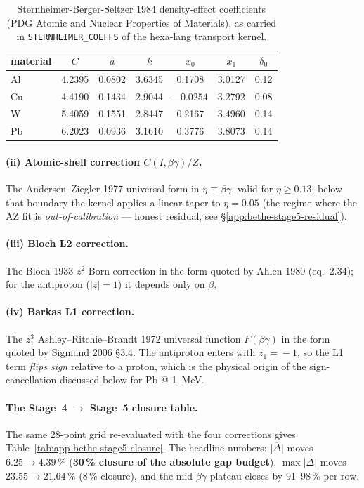 \begin{table}[h]
\centering
\small
\setlength{\tabcolsep}{6pt}
\begin{tabular}{@{}l c c c c c c@{}}
\toprule
material & $C$ & $a$ & $k$ & $x_0$ & $x_1$ & $\delta_0$ \\
\midrule
Al & 4.2395 & 0.0802 & 3.6345 & 0.1708 & 3.0127 & 0.12 \\
Cu & 4.4190 & 0.1434 & 2.9044 & $-0.0254$ & 3.2792 & 0.08 \\
W  & 5.4059 & 0.1551 & 2.8447 & 0.2167 & 3.4960 & 0.14 \\
Pb & 6.2023 & 0.0936 & 3.1610 & 0.3776 & 3.8073 & 0.14 \\
\bottomrule
\end{tabular}
\caption{Sternheimer-Berger-Seltzer 1984 density-effect coefficients
(PDG Atomic and Nuclear Properties of Materials), as carried in
\texttt{STERNHEIMER\_COEFFS} of the hexa-lang transport kernel.}
\label{tab:app-bethe-sternheimer-coeffs}
\end{table}

\paragraph{(ii) Atomic-shell correction $C(I,\beta\gamma)/Z$.} The
Andersen--Ziegler 1977 universal form in $\eta\!\equiv\!\beta\gamma$,
valid for $\eta\!\ge\!0.13$; below that boundary the kernel applies a
linear taper to $\eta\!=\!0.05$ (the regime where the AZ fit is
\emph{out-of-calibration} --- honest residual, see
\S\ref{app:bethe-stage5-residual}).

\paragraph{(iii) Bloch L2 correction.} The Bloch 1933 $z^2$
Born-correction in the form quoted by Ahlen 1980 (eq.~2.34); for the
antiproton ($|z|\!=\!1$) it depends only on $\beta$.

\paragraph{(iv) Barkas L1 correction.} The $z_1^3$ Ashley--Ritchie--Brandt
1972 universal function $F(\beta\gamma)$ in the form quoted by Sigmund
2006 \S3.4. The antiproton enters with $z_1\!=\!-1$, so the L1 term
\emph{flips sign} relative to a proton, which is the physical origin of
the sign-cancellation discussed below for Pb @ \SI{1}{MeV}.

\paragraph{The Stage~4 $\to$ Stage~5 closure table.} The same 28-point
grid re-evaluated with the four corrections gives
Table~\ref{tab:app-bethe-stage5-closure}. The headline numbers:
$\overline{|\Delta|}$ moves $6.25\!\to\!4.39\,\%$
(\textbf{30\,\% closure of the absolute gap budget}),
$\max|\Delta|$ moves $23.55\!\to\!21.64\,\%$ (8\,\% closure), and the
mid-$\beta\gamma$ plateau closes by 91--98\,\% per row.

